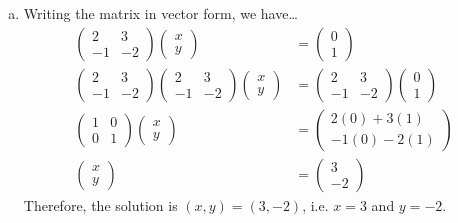 \documentclass[11pt,letterpaper]{article}
\begin{document}
\begin{enumerate}[(a)]
\item Writing the matrix in vector form, we have\dots
	\[
	\begin{aligned}
	\begin{pmatrix}
	2 & 3 \\
	-1 & -2
	\end{pmatrix}
	\begin{pmatrix} x \\ y \end{pmatrix}&= 
	\begin{pmatrix} 0 \\ 1 \end{pmatrix} \\
	\begin{pmatrix} 2 & 3 \\ -1 & -2 \end{pmatrix}
	\begin{pmatrix}
	2 & 3 \\
	-1 & -2
	\end{pmatrix}
	\begin{pmatrix} x \\ y \end{pmatrix}&= 
	\begin{pmatrix} 2 & 3 \\ -1 & -2 \end{pmatrix}
	\begin{pmatrix} 0 \\ 1 \end{pmatrix} \\
	\begin{pmatrix} 1 & 0 \\ 0 & 1 \end{pmatrix} \begin{pmatrix} x \\ y \end{pmatrix}&= 
	\begin{pmatrix} 2(0) + 3(1) \\ -1(0) - 2(1) \end{pmatrix} \\
	\begin{pmatrix} x \\ y \end{pmatrix}&= 
	\begin{pmatrix} 3 \\ -2 \end{pmatrix}
	\end{aligned}
	\]
Therefore, the solution is $(x, y)= (3, -2)$, i.e. $x= 3$ and $y= -2$. 
\end{enumerate}
\end{document}
